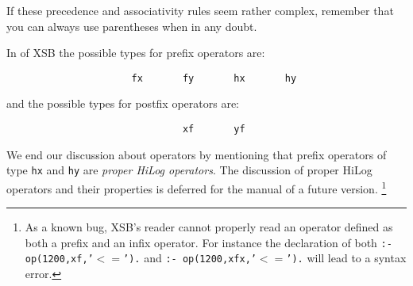 If these precedence and associativity rules seem rather complex, remember
that you can always use parentheses when in any doubt.

In \version{} of XSB the possible types for prefix operators are:
\begin{verbatim}
                      fx       fy       hx       hy
\end{verbatim}
and the possible types for postfix operators are:
\begin{verbatim}
                               xf       yf
\end{verbatim}

We end our discussion about operators by mentioning that prefix
operators of type {\tt hx} and {\tt hy} are {\em proper HiLog
  operators}.  The discussion of proper HiLog operators and their
properties is deferred for the manual of a future version.
\footnote{As a known bug, XSB's reader cannot properly read an
  operator defined as both a prefix and an infix operator.  For
  instance the declaration of both {\tt :- op(1200,xf,'$<=$').} and 
{\tt :- op(1200,xfx,'$<=$').} will lead to a syntax error.}

